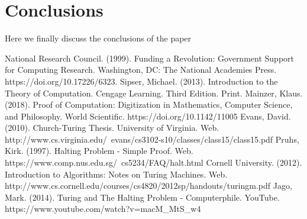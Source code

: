 \documentclass{article}
\begin{document}
\section{Conclusions}
Here we finally discuss the conclusions of the paper

\begin{thebibliography}{100}
	 National Research Council. (1999). Funding a Revolution: Government Support for Computing Research. Washington, DC: The National Academies Press. https://doi.org/10.17226/6323.
	 Sipser, Michael. (2013). Introduction to the Theory of Computation. Cengage Learning. Third Edition. Print.
	 Mainzer, Klaus. (2018). Proof of Computation: Digitization in Mathematics, Computer Science, and Philosophy. World Scientific. https://doi.org/10.1142/11005
	 Evans, David. (2010). Church-Turing Thesis. University of Virginia. Web. http://www.cs.virginia.edu/~evans/cs3102-s10/classes/class15/class15.pdf
	 Pruhs, Kirk. (1997). Halting Problem - Simple Proof. Web. https://www.comp.nus.edu.sg/~cs5234/FAQ/halt.html
	 Cornell University. (2012). Introduction to Algorithms: Notes on Turing Machines. Web. http://www.cs.cornell.edu/courses/cs4820/2012sp/handouts/turingm.pdf
	 Jago, Mark. (2014). Turing and The Halting Problem - Computerphile. YouTube. https://www.youtube.com/watch?v=macM\_MtS\_w4
\end{thebibliography}
\end{document}
